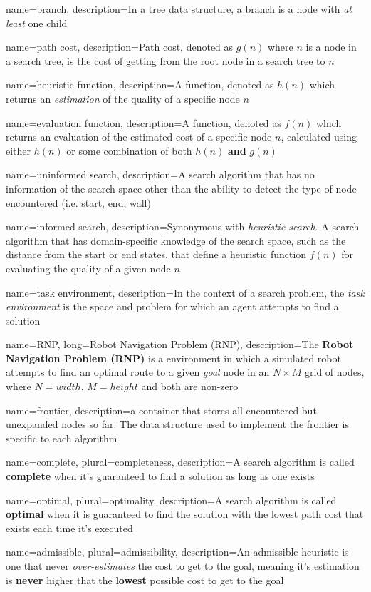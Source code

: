 {
	name=branch,
	description={In a \gls{tree} data structure, a branch is a \gls{node} with \textit{at least} one child}
}

{
	name={path cost},
	description={Path cost, denoted as $g(n)$ where $n$ is a node in a search tree, is the cost of getting from the root node in a search tree to $n$}
}

{
	name={heuristic function},
	description={A function, denoted as $h(n)$ which returns an \textit{estimation} of the quality of a specific node $n$}
}

{
	name={evaluation function},
	description={A function, denoted as $f(n)$ which returns an evaluation of the estimated cost of a specific node $n$, calculated using either $h(n)$ or some combination of both $h(n)$ \textbf{and} $g(n)$}
}

{
	name={uninformed search},
	description={A search algorithm that has no information of the search space other than the ability to detect the type of node encountered (i.e. start, end, wall)}
}

{
	name={informed search},
	description={Synonymous with \textit{heuristic search}. A search algorithm that has domain-specific knowledge of the search space, such as the distance from the start or end states, that define a \gls{heuristic} function $f(n)$ for evaluating the quality of a given node $n$}
}

{
	name={task environment},
	description={In the context of a search problem, the \textit{task environment} is the space and problem for which an agent attempts to find a solution}
}

{
	name={RNP},
	long={Robot Navigation Problem (RNP)},
	description={The \textbf{Robot Navigation Problem (RNP)} is a \Gls{environment} in which a simulated robot attempts to find an optimal route to a given \textit{goal} \gls{node} in an $N \times M$ grid of nodes, where $N=width$, $M=height$ and both are non-zero}
}

{
	name=frontier,
	description={a container that stores all encountered but unexpanded nodes so far. The data structure used to implement the frontier is specific to each algorithm}
}

{
	name=complete,
	plural=completeness,
	description={A search algorithm is called \textbf{complete} when it's guaranteed to find a solution as long as one exists}
}

{
	name=optimal,
	plural=optimality,
	description={A search algorithm is called \textbf{optimal} when it is guaranteed to find the solution with the lowest path cost that exists each time it's executed}
}

{
	name=admissible,
	plural=admissibility,
	description={An admissible heuristic is one that never \textit{over-estimates} the cost to get to the goal, meaning it's estimation is \textbf{never} higher that the \textbf{lowest} possible cost to get to the goal}
}
